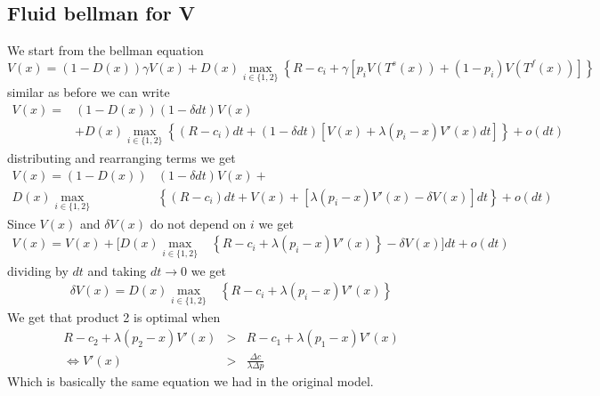 \documentclass[11pt]{article}
\begin{document}
\subsection*{Fluid bellman for V}
We start from the bellman equation 
\begin{equation*}
  V(x)= (1-D(x))\gamma V(x) + D(x)\max_{i \in\{1,2\}} \left\{R-c_i + \gamma[p_iV(T^s(x)) +(1-p_i)V(T^f(x))]\right\}
\end{equation*}
similar as before we can write
\begin{equation*}
  \begin{aligned}
  V(x)={}& (1-D(x))(1-\delta dt) V(x) \\
  &+ D(x)\max_{i \in\{1,2\}} \left\{(R-c_i)dt + (1-\delta dt)[V(x) +\lambda(p_i-x)V'(x)dt]\right\} + o(dt)
  \end{aligned}
\end{equation*}
distributing and rearranging terms we get 
\begin{align*}
  V(x)= (1-D(x))&(1-\delta dt) V(x) + \\D(x)\max_{i \in\{1,2\}} &\left\{(R-c_i)dt + V(x) + [\lambda(p_i-x)V'(x) - \delta V(x)]dt \right\} +o(dt)
\end{align*}
Since $V(x)$ and $\delta V(x)$ do not depend on $i$ we get
\begin{align*}
  V(x)= V(x) + [D(x)\max_{i \in\{1,2\}} &\left\{R-c_i + \lambda(p_i-x)V'(x) \right\} -\delta V(x)]dt + o(dt)
\end{align*}
dividing by $dt$ and taking $dt\rightarrow 0 $ we get
\begin{align*}
  \delta V(x)= D(x)\max_{i \in\{1,2\}} &\left\{R-c_i + \lambda(p_i-x)V'(x) \right\} 
\end{align*}
We get that product 2 is optimal when 
\begin{eqnarray}
  R-c_2 + \lambda(p_2-x)V'(x) &>& R-c_1 + \lambda(p_1-x)V'(x)\\
  \iff V'(x) &>& \frac{\Delta c}{\lambda\Delta p}
\end{eqnarray}
Which is basically the same equation we had in the original model. 
\end{document}

